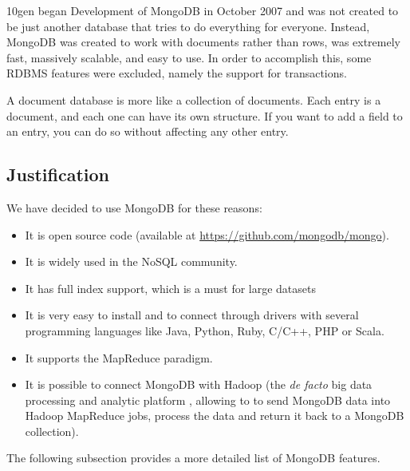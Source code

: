 10gen began Development of MongoDB in October 2007 and was not created to be just another database that tries to do everything for everyone. Instead, MongoDB was created to work with documents rather than rows, was extremely fast, massively scalable, and easy to use. In order to accomplish this, some
RDBMS
features were excluded, namely
the
support for transactions.

A document database is more like a collection of documents. Each entry is a document, and each one can have its own structure. If you want to add a field to an entry, you can do so without affecting any other entry.



\subsection{Justification} %
\label{sub:justification}

We have decided to use MongoDB for these reasons:

\begin{itemize}
\item It is open source code (available at \url{https://github.com/mongodb/mongo}).
\item It is widely used in the NoSQL community.
\item It has full index %
support, which is a must for large datasets
\item It is very
easy to install and to connect through drivers with several programming languages like Java, Python, Ruby, C/C++, PHP or Scala.
\item It supports
the
MapReduce paradigm.
\item It is possible to connect MongoDB with Hadoop (the \emph{de facto} big data processing and analytic platform ,
allowing to to send MongoDB data into Hadoop MapReduce jobs, process the data and return it back to a MongoDB collection).
\end{itemize}

The following subsection provides a more detailed list of MongoDB features.


